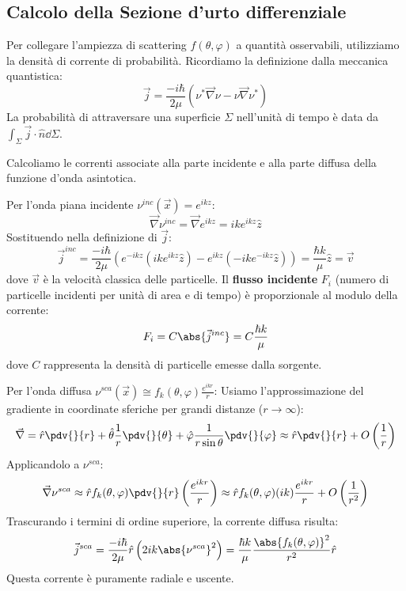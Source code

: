 \subsection{Calcolo della Sezione d'urto differenziale}

Per collegare l'ampiezza di scattering \( f(\theta, \varphi) \) a quantità osservabili, utilizziamo la densità di corrente di probabilità.
Ricordiamo la definizione dalla meccanica quantistica:
\begin{equation}
    \vec{j} = \frac{-i\hbar}{2\mu} \left( \nu^* \vec{\nabla} \nu - \nu \vec{\nabla} \nu^* \right)
\end{equation}
La probabilità di attraversare una superficie \( \Sigma \) nell'unità di tempo è data da \( \int_\Sigma \vec{j} \cdot \hat{n} \dd{\Sigma} \).

Calcoliamo le correnti associate alla parte incidente e alla parte diffusa della funzione d'onda asintotica.

Per l'onda piana incidente \( \nu^{inc}(\vec{x}) = e^{ikz} \):
\[
    \vec{\nabla} \nu^{inc} = \vec{\nabla} e^{ikz} = i k e^{ikz} \hat{z}
\]
Sostituendo nella definizione di \( \vec{j} \):
\begin{equation}
    \vec{j}^{inc} = \frac{-i\hbar}{2\mu} \left( e^{-ikz} (ik e^{ikz} \hat{z}) - e^{ikz} (-ik e^{-ikz} \hat{z}) \right) = \frac{\hbar k}{\mu} \hat{z} = \vec{v}
\end{equation}
dove \( \vec{v} \) è la velocità classica delle particelle.
Il \textbf{flusso incidente} \( F_i \) (numero di particelle incidenti per unità di area e di tempo) è proporzionale al modulo della corrente:
\[
    F_i = C \abs{\vec{j}^{inc}} = C \frac{\hbar k}{\mu}
\]
dove \( C \) rappresenta la densità di particelle emesse dalla sorgente.


Per l'onda diffusa \( \nu^{sca}(\vec{x}) \cong f_k(\theta, \varphi) \frac{e^{ikr}}{r} \):
Usiamo l'approssimazione del gradiente in coordinate sferiche per grandi distanze (\( r \to \infty \)):
\[
    \vec{\nabla} = \hat{r} \pdv{}{r} + \hat{\theta} \frac{1}{r} \pdv{}{\theta} + \hat{\varphi} \frac{1}{r \sin\theta} \pdv{}{\varphi} \approx \hat{r} \pdv{}{r} + O\left(\frac{1}{r}\right)
\]
Applicandolo a \( \nu^{sca} \):
\[
    \vec{\nabla} \nu^{sca} \approx \hat{r} f_k(\theta, \varphi) \pdv{}{r} \left( \frac{e^{ikr}}{r} \right) \approx \hat{r} f_k(\theta, \varphi) (ik) \frac{e^{ikr}}{r} + O\left(\frac{1}{r^2}\right)
\]
Trascurando i termini di ordine superiore, la corrente diffusa risulta:
\begin{equation}
    \vec{j}^{sca} = \frac{-i\hbar}{2\mu} \hat{r} \left( 2ik \abs{\nu^{sca}}^2 \right) = \frac{\hbar k}{\mu} \frac{\abs{f_k(\theta, \varphi)}^2}{r^2} \hat{r}
\end{equation}
Questa corrente è puramente radiale e uscente.


